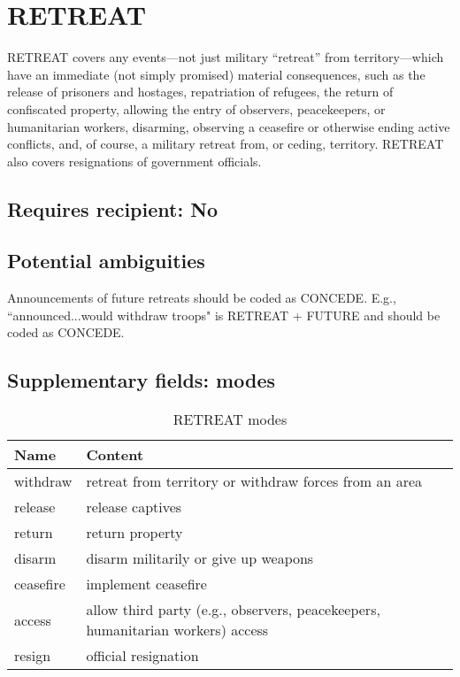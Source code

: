 \documentclass[11pt]{report}
\newcommand{\plcat}[1]{\textsf{#1}}
\begin{document}
\newpage

\section{RETREAT}

\plcat{RETREAT} covers any events---not just military ``retreat'' from territory---which have an immediate (not simply promised) material consequences, such as the release of prisoners and hostages, repatriation of refugees, the return of  confiscated property, allowing the entry of observers, peacekeepers, or humanitarian workers, disarming, observing a ceasefire or otherwise ending active conflicts, and, of course, a military retreat from, or ceding, territory. \plcat{RETREAT} also covers resignations of government officials.

\subsection{Requires recipient: No}

\subsection{Potential ambiguities}

Announcements of future retreats should be coded as \plcat{CONCEDE}. E.g., ``announced...would withdraw troops" is \plcat{RETREAT} + \plcat{FUTURE} and should be coded as \plcat{CONCEDE}.

\subsection{Supplementary fields: modes}

\begin{table}[htp]
\caption{RETREAT modes}
\begin{center}
\begin{tabular}{|l|p{13cm}|}
\hline
Name & Content \\
\hline
withdraw & retreat from territory or withdraw forces from an area\\
release & release captives \\
return & return property \\
disarm & disarm militarily or give up weapons\\ 
ceasefire & implement ceasefire\\
access & allow third party (e.g., observers, peacekeepers, humanitarian workers) access \\
resign & official resignation \\
\hline
\end{tabular}
\end{center}
\label{tab:retreatmode}
\end{table}%
\end{document}
